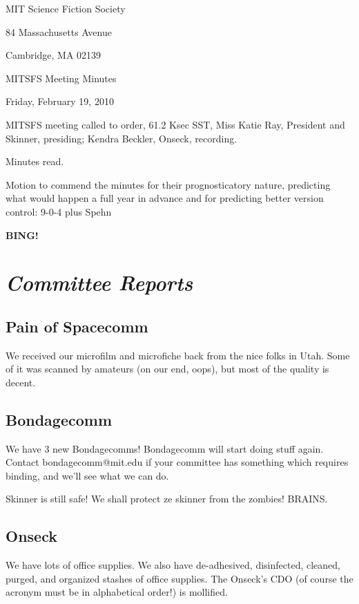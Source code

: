 \documentclass[10pt]{article}
\newcommand{\bing}{{\bf BING!} }
\newcommand{\goto}[1]{\bing \vskip 12pt \section*{{\em{#1}}}}
\newcommand{\ps}{ plus Spehn\xspace}
\newcommand{\skinner}{Miss Katie Ray, President and Skinner}
\newcommand{\onseck}{Kendra Beckler, Onseck}
\newcommand{\meetingdate}{Friday, February 19, 2010}
\begin{document}
\begin{center}

MIT Science Fiction Society

84 Massachusetts Avenue

Cambridge, MA 02139

\vspace{12pt}

MITSFS Meeting Minutes

\meetingdate

\end{center}

\vspace{18pt}

\setlength{\parskip}{6pt}

\noindent
MITSFS meeting called to order, 61.2 Ksec SST,
\skinner, presiding; \onseck, recording.

Minutes read.

Motion to commend the minutes for their prognosticatory nature, predicting what would happen a full year in advance and for predicting better version control: 9-0-4 \ps

\goto{Committee Reports}

\subsection*{Pain of Spacecomm}

We received our microfilm and microfiche back from the nice folks in Utah.  Some of it was scanned by amateurs (on our end, oops), but most of the quality is decent.

\subsection*{Bondagecomm}

We have 3 new Bondagecomms!  Bondagecomm will start doing stuff again.  Contact bondagecomm@mit.edu if your committee has something which requires binding, and we'll see what we can do.

Skinner is still safe!  We shall protect ze skinner from the zombies!  BRAINS.

\subsection*{Onseck}

We have lots of office supplies.  We also have de-adhesived, disinfected, cleaned, purged, and organized stashes of office supplies.  The Onseck's CDO (of course the acronym must be in alphabetical order!) is mollified.
\end{document}
